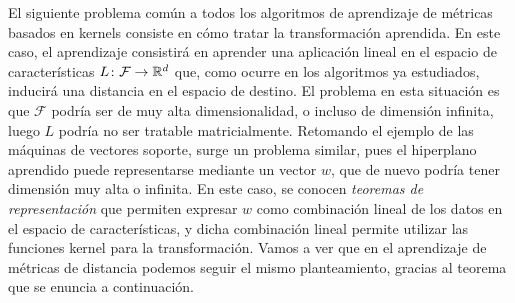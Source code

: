 \documentclass{book}
\begin{document}
El siguiente problema común a todos los algoritmos de aprendizaje de métricas basados en kernels consiste en cómo tratar la transformación aprendida. En este caso, el aprendizaje consistirá en aprender una aplicación lineal en el espacio de características $L \colon \mathcal{F} \to \mathbb{R}^d$ que, como ocurre en los algoritmos ya estudiados, inducirá una distancia en el espacio de destino. El problema en esta situación es que $\mathcal{F}$ podría ser de muy alta dimensionalidad, o incluso de dimensión infinita, luego $L$ podría no ser tratable matricialmente. Retomando el ejemplo de las máquinas de vectores soporte, surge un problema similar, pues el hiperplano aprendido puede representarse mediante un vector $w$, que de nuevo podría tener dimensión muy alta o infinita. En este caso, se conocen \emph{teoremas de representación} que permiten expresar $w$ como combinación lineal de los datos en el espacio de características, y dicha combinación lineal permite utilizar las funciones kernel para la transformación. Vamos a ver que en el aprendizaje de métricas de distancia podemos seguir el mismo planteamiento, gracias al teorema que se enuncia a continuación.
\end{document}
